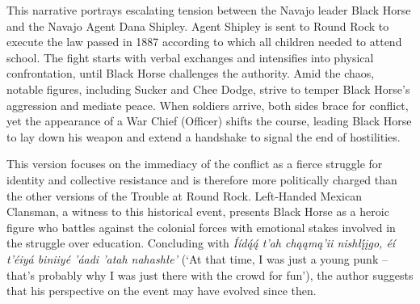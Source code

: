This narrative portrays escalating tension between the Navajo leader Black Horse and the Navajo Agent Dana Shipley. Agent Shipley is sent to Round Rock to execute the law passed in 1887 according to which all children needed to attend school. The fight starts with verbal exchanges and intensifies into physical confrontation, until Black Horse challenges the authority. Amid the chaos, notable figures, including Sucker and Chee Dodge, strive to temper Black Horse's aggression and mediate peace. When soldiers arrive, both sides brace for conflict, yet the appearance of a War Chief (Officer) shifts the course, leading Black Horse to lay down his weapon and extend a handshake to signal the end of hostilities.

This version focuses on the immediacy of the conflict as a fierce struggle for identity and collective resistance and is therefore more politically charged than the other versions of the Trouble at Round Rock. Left-Handed Mexican Clansman, a witness to this historical event, presents Black Horse as a heroic figure who battles against the colonial forces with emotional stakes involved in the struggle over education. Concluding with \textit{Íídą́ą́ t’ah chąąmą’ii nishłį́įgo, éí t’éiyá biniiyé ’áadi ’atah nahashłe’} (`At that time, I was just a young punk -- that’s probably why I was just there with the crowd for fun'), the author suggests that his perspective on the event may have evolved since then.